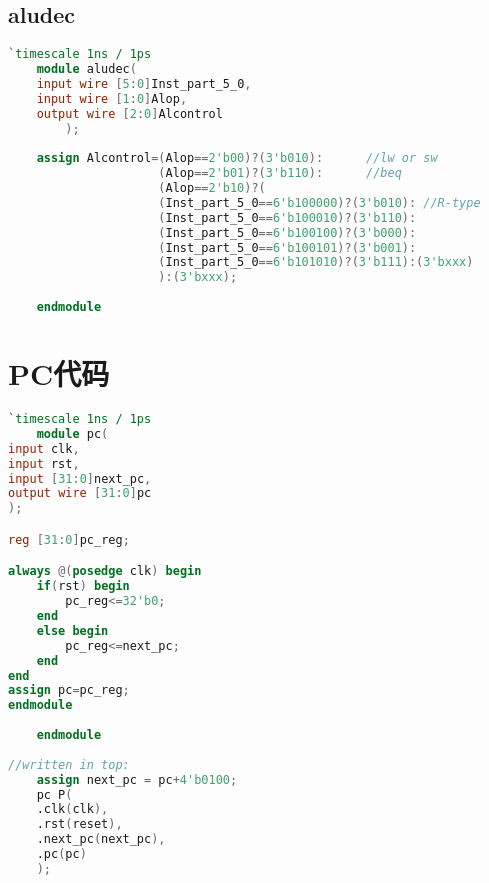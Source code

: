 \subsection{aludec}
\begin{lstlisting}[language=Verilog]
    `timescale 1ns / 1ps
    module aludec(
    input wire [5:0]Inst_part_5_0,
    input wire [1:0]Alop,
    output wire [2:0]Alcontrol
        );
    
    assign Alcontrol=(Alop==2'b00)?(3'b010):      //lw or sw
                     (Alop==2'b01)?(3'b110):      //beq
                     (Alop==2'b10)?(
                     (Inst_part_5_0==6'b100000)?(3'b010): //R-type
                     (Inst_part_5_0==6'b100010)?(3'b110):
                     (Inst_part_5_0==6'b100100)?(3'b000):
                     (Inst_part_5_0==6'b100101)?(3'b001):
                     (Inst_part_5_0==6'b101010)?(3'b111):(3'bxxx)
                     ):(3'bxxx);
    
    endmodule
\end{lstlisting}

\section{PC代码}
\begin{lstlisting}[language=Verilog]
    `timescale 1ns / 1ps
    module pc(
input clk,
input rst,
input [31:0]next_pc,
output wire [31:0]pc
);

reg [31:0]pc_reg;

always @(posedge clk) begin
    if(rst) begin
        pc_reg<=32'b0;
    end
    else begin
        pc_reg<=next_pc;
    end
end
assign pc=pc_reg;
endmodule
    
    endmodule
    
//written in top:
    assign next_pc = pc+4'b0100;
    pc P(
    .clk(clk),
    .rst(reset),
    .next_pc(next_pc),
    .pc(pc)
    );
\end{lstlisting}
